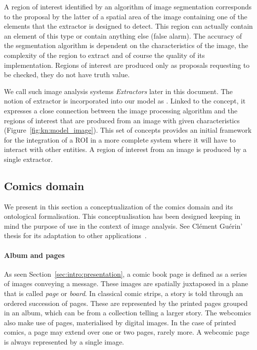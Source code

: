 A region of interest identified by an algorithm of image segmentation corresponds to the proposal by the latter of a spatial area of the image containing one of the elements that the extractor is designed to detect.
This region can actually contain an element of this type or contain anything else (false alarm).
The accuracy of the segmentation algorithm is dependent on the characteristics of the image, the complexity of the region to extract and of course the quality of its implementation.
Regions of interest are produced only as proposals requesting to be checked, they do not have truth value.

We call such image analysis systems \textit{Extractors} later in this document.
The notion of extractor is incorporated into our model as .
Linked to the  concept, it expresses a close connection between the image processing algorithm and the regions of interest that are produced from an image with given characteristics (Figure~\ref{fig:kn:model_image}).
This set of concepts provides an initial framework for the integration of a ROI in a more complete system where it will have to interact with other entities.
A region of interest from an image is produced by a single extractor.


\subsection{Comics domain} %
\label{sub:kn:comics_domain}

We present in this section a conceptualization of the comics domain and its ontological formalisation.
This conceptualisation has been designed keeping in mind the purpose of use in the context of image analysis.
See Cl{\'e}ment Gu{\'e}rin' thesis for its adaptation to other applications~\cite{phdthesisGuerin14}.

\paragraph{Album and pages} %
\label{par:album_and_pages}

As seen Section~\ref{sec:intro:presentation}, a comic book page is defined as a series of images conveying a message.
These images are spatially juxtaposed in a plane that is called \emph{page} or \emph{board}.
In classical comic strips, a story is told through an ordered succession of pages.
These are represented by the printed pages grouped in an album, which can be from a  collection telling a larger story.
The webcomics also make use of pages, materialised by digital images.
In the case of printed comics, a page may extend over one or two pages, rarely more.
A webcomic page is always represented by a single image.

